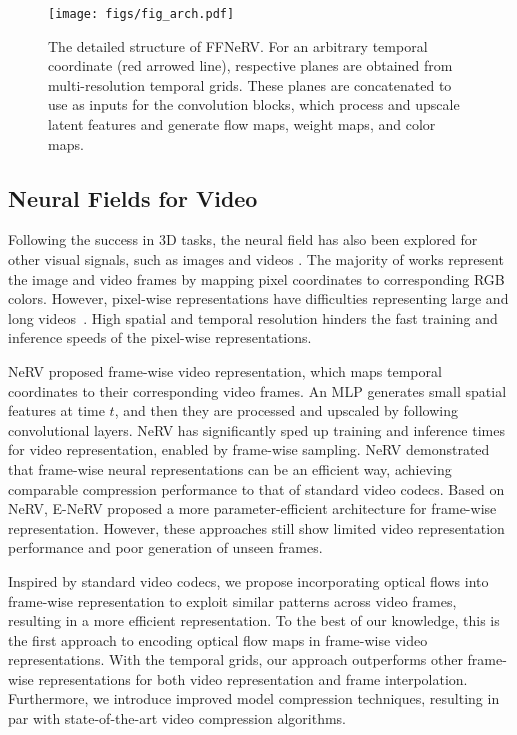 \documentclass[sigconf]{acmart}
\begin{document}
\begin{figure*}[t]
\begin{center}
\texttt{[image: figs/fig\_arch.pdf]}
\end{center}
   \caption{The detailed structure of FFNeRV. For an arbitrary temporal coordinate (red arrowed line), respective planes are obtained from multi-resolution temporal grids. These planes are concatenated to use as inputs for the convolution blocks, which process and upscale latent features and generate flow maps, weight maps, and color maps.}
\label{fig_arch}
\end{figure*}

\subsection{Neural Fields for Video}
Following the success in 3D tasks, the neural field has also been explored for other visual signals, such as images \cite{coin, img_comp, liif} and videos \cite{videoinr, video_cohen, video_rho, scalable}.
The majority of works represent the image and video frames by mapping pixel coordinates to corresponding RGB colors.
However, pixel-wise representations have difficulties representing large and long videos~\cite{nerv}. High spatial and temporal resolution hinders the fast training and inference speeds of the pixel-wise representations.

NeRV \cite{nerv} proposed frame-wise video representation, which maps temporal coordinates to their corresponding video frames.
An MLP generates small spatial features at time $t$, and then they are processed and upscaled by following convolutional layers.
NeRV has significantly sped up training and inference times for video representation, enabled by frame-wise sampling.
NeRV demonstrated that frame-wise neural representations can be an efficient way, achieving comparable compression performance to that of standard video codecs.
Based on NeRV, E-NeRV \cite{enerv} proposed a more parameter-efficient architecture for frame-wise representation.
However, these approaches still show limited video representation performance and poor generation of unseen frames.

Inspired by standard video codecs, we propose incorporating optical flows into frame-wise representation to exploit similar patterns across video frames, resulting in a more efficient representation.
To the best of our knowledge, this is the first approach to encoding optical flow maps in frame-wise video representations.
With the temporal grids, our approach outperforms other frame-wise representations for both video representation and frame interpolation.
Furthermore, we introduce improved model compression techniques, resulting in par with state-of-the-art video compression algorithms.
\end{document}

